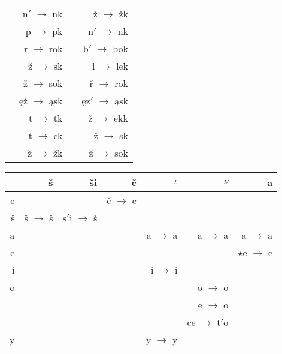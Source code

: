 \documentclass{article}
\begin{document}
\begin{longtable}{r|rrr}
 & n$'$ $\rightarrow$ nk &  & ž $\rightarrow$ žk\\
 & p $\rightarrow$ pk &  & n$'$ $\rightarrow$ nk\\
 & r $\rightarrow$ rok &  & b$'$ $\rightarrow$ bok\\
 & ž $\rightarrow$ sk &  & l $\rightarrow$ lek\\
 & ž $\rightarrow$ sok &  & ř $\rightarrow$ rok\\
 & ęž $\rightarrow$ ąsk &  & ęz$'$ $\rightarrow$ ąsk\\
 & t $\rightarrow$ tk &  & ž $\rightarrow$ ekk\\
 & t $\rightarrow$ ck &  & ž $\rightarrow$ sk\\
 & ž $\rightarrow$ žk &  & ž $\rightarrow$ sok\\
\hline
\end{longtable}

\begin{longtable}{r|rrrrrr}
 & {\bf š} & {\bf ši} & {\bf č} & \boldmath$\iota$ & \boldmath$\nu$ & {\bf a}\\
\hline
c &  &  & č $\rightarrow$ c &  &  & \\
\hline
š & š $\rightarrow$ š & s$'$i $\rightarrow$ š &  &  &  & \\
\hline
a &  &  &  & a $\rightarrow$ a & a $\rightarrow$ a & a $\rightarrow$ a\\
\hline
e &  &  &  &  &  & $\star$e $\rightarrow$ e\\
\hline
i &  &  &  & i $\rightarrow$ i &  & \\
\hline
o &  &  &  &  & o $\rightarrow$ o & \\
 &  &  &  &  & e $\rightarrow$ o & \\
 &  &  &  &  & ce $\rightarrow$ t$'$o & \\
\hline
y &  &  &  & y $\rightarrow$ y &  & \\
\hline
\end{longtable}
\end{document}
